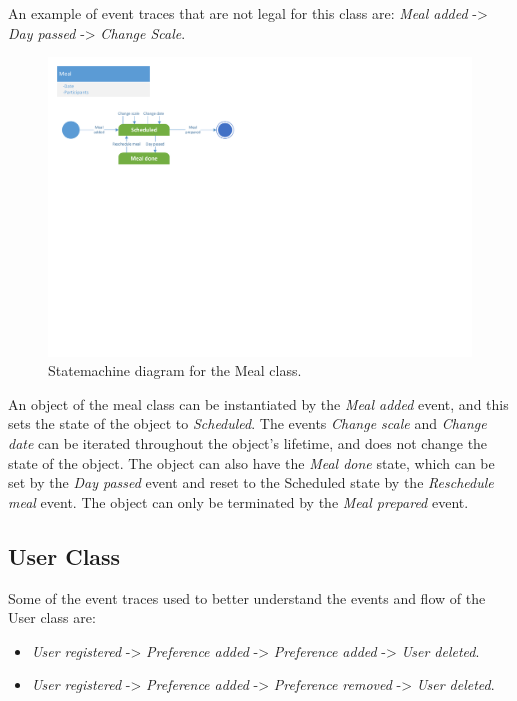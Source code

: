 An example of event traces that are not legal for this class are: \textit{Meal added} -> \textit{Day passed} -> \textit{Change Scale}.

\begin{figure}[H]
	\centering
	\includegraphics[clip=true, trim=0.5cm 13cm 16.5cm 0.5cm]{Grafik/FoodPlanner/Meal.pdf}
	\caption{Statemachine diagram for the Meal class.} \label{MealClass}
\end{figure}

An object of the meal class can be instantiated by the \textit{Meal added} event, and this sets the state of the object to \textit{Scheduled}. The events \textit{Change scale} and \textit{Change date} can be iterated throughout the object's lifetime, and does not change the state of the object. The object can also have the \textit{Meal done} state, which can be set by the \textit{Day passed} event and reset to the Scheduled state by the \textit{Reschedule meal} event. The object can only be terminated by the \textit{Meal prepared} event.

\subsection{User Class}
Some of the event traces used to better understand the events and flow of the User class are:

\begin{itemize}
	\item \textit{User registered} -> \textit{Preference added} -> \textit{Preference added} -> \textit{User deleted}.
	\item \textit{User registered} -> \textit{Preference added} -> \textit{Preference removed} -> \textit{User deleted}.
\end{itemize}

